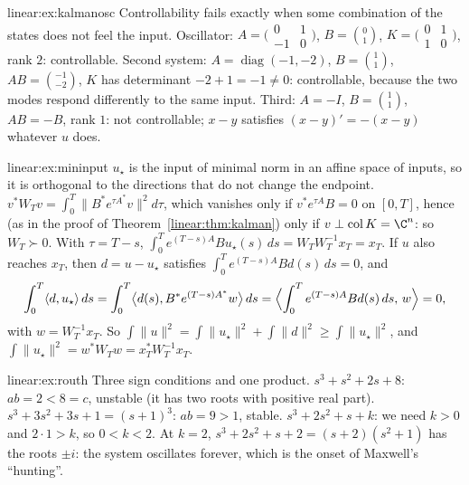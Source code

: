 \begin{solution}{linear:ex:kalmanosc}
\idea Controllability fails exactly when some combination of the states does not feel the input.
\writeup Oscillator: $A=\bigl(\begin{smallmatrix}0&1\\-1&0\end{smallmatrix}\bigr)$, $B=\binom01$, $K=\bigl(\begin{smallmatrix}0&1\\1&0\end{smallmatrix}
\bigr)$, rank $2$: controllable. Second system: $A=\operatorname{diag}(-1,-2)$, $B=\binom11$, $AB=\binom{-1}{-2}$, $K$ has determinant $-2+1=-1\ne0$:
controllable, because the two modes respond differently to the same input. Third: $A=-I$, $B=\binom11$, $AB=-B$, rank $1$: not controllable;
$x-y$ satisfies $(x-y)'=-(x-y)$ whatever $u$ does.
\end{solution}

\begin{solution}{linear:ex:mininput}
\idea $u_\star$ is the input of minimal norm in an affine space of inputs, so it is orthogonal to the directions that do not change the
endpoint.
\writeup $v^*W_Tv=\int_0^T\|B^*e^{\tau A^*}v\|^2d\tau$, which vanishes only if $v^*e^{\tau A}B=0$ on $[0,T]$, hence (as in the proof of
Theorem~\ref{linear:thm:kalman}) only if $v\perp\operatorname{col}K=\C^n$: so $W_T\succ0$. With $\tau=T-s$, $\int_0^Te^{(T-s)A}Bu_\star(s)\,ds=W_TW_T^{-1}x_T=x_T$.
If $u$ also reaches $x_T$, then $d=u-u_\star$ satisfies $\int_0^Te^{(T-s)A}Bd(s)\,ds=0$, and
\[
\int_0^T\langle d,u_\star\rangle\,ds=\int_0^T\bigl\langle d(s),B^*e^{(T-s)A^*}w\bigr\rangle\,ds=\Bigl\langle\int_0^Te^{(T-s)A}Bd(s)\,ds,\,w\Bigr\rangle=0,
\]
with $w=W_T^{-1}x_T$. So $\int\|u\|^2=\int\|u_\star\|^2+\int\|d\|^2\ge\int\|u_\star\|^2$, and $\int\|u_\star\|^2=w^*W_Tw=x_T^*W_T^{-1}x_T$.
\end{solution}

\begin{solution}{linear:ex:routh}
\idea Three sign conditions and one product.
\writeup $s^3+s^2+2s+8$: $ab=2<8=c$, unstable (it has two roots with positive real part). $s^3+3s^2+3s+1=(s+1)^3$:
$ab=9>1$, stable. $s^3+2s^2+s+k$: we need $k>0$ and $2\cdot1>k$, so $0<k<2$. At $k=2$, $s^3+2s^2+s+2=(s+2)(s^2+1)$ has the roots $\pm i$: the
system oscillates forever, which is the onset of Maxwell's ``hunting''.
\end{solution}

